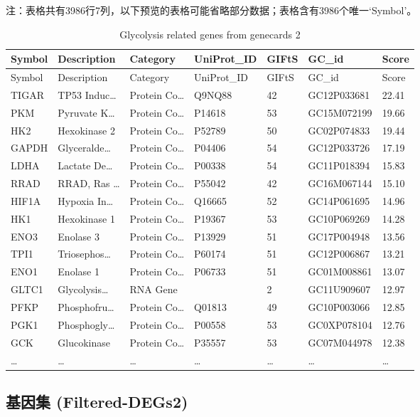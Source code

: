 \documentclass[
]{article}
\begin{document}
\begin{center}\begin{tcolorbox}[colback=gray!10, colframe=gray!50, width=0.9\linewidth, arc=1mm, boxrule=0.5pt]注：表格共有3986行7列，以下预览的表格可能省略部分数据；表格含有3986个唯一`Symbol'。
\end{tcolorbox}
\end{center}

\begin{longtable}[]{@{}lllllll@{}}
\caption{\label{tab:Glycolysis-related-genes-from-genecards-2}Glycolysis related genes from genecards 2}\tabularnewline
\toprule
Symbol & Description & Category & UniProt\_ID & GIFtS & GC\_id & Score\tabularnewline
\midrule
\endfirsthead
\toprule
Symbol & Description & Category & UniProt\_ID & GIFtS & GC\_id & Score\tabularnewline
\midrule
\endhead
TIGAR & TP53 Induc\ldots{} & Protein Co\ldots{} & Q9NQ88 & 42 & GC12P033681 & 22.41\tabularnewline
PKM & Pyruvate K\ldots{} & Protein Co\ldots{} & P14618 & 53 & GC15M072199 & 19.66\tabularnewline
HK2 & Hexokinase 2 & Protein Co\ldots{} & P52789 & 50 & GC02P074833 & 19.44\tabularnewline
GAPDH & Glyceralde\ldots{} & Protein Co\ldots{} & P04406 & 54 & GC12P033726 & 17.19\tabularnewline
LDHA & Lactate De\ldots{} & Protein Co\ldots{} & P00338 & 54 & GC11P018394 & 15.83\tabularnewline
RRAD & RRAD, Ras \ldots{} & Protein Co\ldots{} & P55042 & 42 & GC16M067144 & 15.10\tabularnewline
HIF1A & Hypoxia In\ldots{} & Protein Co\ldots{} & Q16665 & 52 & GC14P061695 & 14.96\tabularnewline
HK1 & Hexokinase 1 & Protein Co\ldots{} & P19367 & 53 & GC10P069269 & 14.28\tabularnewline
ENO3 & Enolase 3 & Protein Co\ldots{} & P13929 & 51 & GC17P004948 & 13.56\tabularnewline
TPI1 & Triosephos\ldots{} & Protein Co\ldots{} & P60174 & 51 & GC12P006867 & 13.21\tabularnewline
ENO1 & Enolase 1 & Protein Co\ldots{} & P06733 & 51 & GC01M008861 & 13.07\tabularnewline
GLTC1 & Glycolysis\ldots{} & RNA Gene & & 2 & GC11U909607 & 12.97\tabularnewline
PFKP & Phosphofru\ldots{} & Protein Co\ldots{} & Q01813 & 49 & GC10P003066 & 12.85\tabularnewline
PGK1 & Phosphogly\ldots{} & Protein Co\ldots{} & P00558 & 53 & GC0XP078104 & 12.76\tabularnewline
GCK & Glucokinase & Protein Co\ldots{} & P35557 & 53 & GC07M044978 & 12.38\tabularnewline
\ldots{} & \ldots{} & \ldots{} & \ldots{} & \ldots{} & \ldots{} & \ldots{}\tabularnewline
\bottomrule
\end{longtable}

\hypertarget{ux57faux56e0ux96c6-filtered-degs2}{%
\subsection{基因集 (Filtered-DEGs2)}\label{ux57faux56e0ux96c6-filtered-degs2}}
\end{document}
